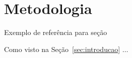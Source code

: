 \section{Metodologia}
\label{sec:metodologia}

Exemplo de referência para seção

Como visto na Seção~\ref{sec:introducao} $\ldots$